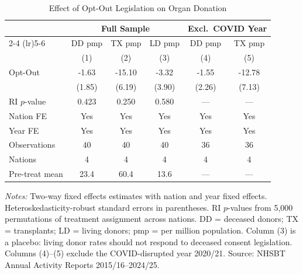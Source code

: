 \begin{table}[htbp]
\centering
\caption{Effect of Opt-Out Legislation on Organ Donation}
\label{tab:did}
\begin{threeparttable}
\begin{tabular}{lccccc}
\toprule
 & \multicolumn{3}{c}{Full Sample} & \multicolumn{2}{c}{Excl.\ COVID Year} \\
\cmidrule(lr){2-4} \cmidrule(lr){5-6}
 & DD pmp & TX pmp & LD pmp & DD pmp & TX pmp \\
 & (1) & (2) & (3) & (4) & (5) \\
\midrule
Opt-Out & -1.63 & -15.10 & -3.32 & -1.55 & -12.78 \\
 & (1.85) & (6.19) & (3.90) & (2.26) & (7.13) \\
RI $p$-value & 0.423 & 0.250 & 0.580 & --- & --- \\
\midrule
Nation FE & Yes & Yes & Yes & Yes & Yes \\
Year FE & Yes & Yes & Yes & Yes & Yes \\
Observations & 40 & 40 & 40 & 36 & 36 \\
Nations & 4 & 4 & 4 & 4 & 4 \\
Pre-treat mean & 23.4 & 60.4 & 13.6 & --- & --- \\
\bottomrule
\end{tabular}
\begin{tablenotes}[flushleft]\footnotesize
\item \textit{Notes:} Two-way fixed effects estimates with nation and year fixed effects. Heteroskedasticity-robust standard errors in parentheses. RI $p$-values from 5{,}000 permutations of treatment assignment across nations. DD = deceased donors; TX = transplants; LD = living donors; pmp = per million population. Column (3) is a placebo: living donor rates should not respond to deceased consent legislation. Columns (4)--(5) exclude the COVID-disrupted year 2020/21. Source: NHSBT Annual Activity Reports 2015/16--2024/25.
\end{tablenotes}
\end{threeparttable}
\end{table}
